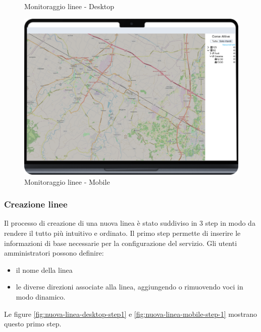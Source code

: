 \begin{figure}[H]
\begin{minipage}[b]{0.25\textwidth}
    \caption{Monitoraggio linee - Desktop}
    \label{fig:monitoraggio_linee_desktop}
  \end{minipage}
  \hfill
  \begin{minipage}[b]{0.68\textwidth}
    \centering
    \includegraphics[width=\textwidth]{images/mockup/Mappa.png}
    \caption{Monitoraggio linee - Mobile}
    \label{fig:monitoraggio_linee_mobile}
  \end{minipage}
\end{figure}

\subsubsection{Creazione linee}

Il processo di creazione di una nuova linea è stato suddiviso in 3 step in modo da rendere il tutto più intuitivo e ordinato.
Il primo step permette di inserire le informazioni di base necessarie per la configurazione del servizio. Gli utenti amministratori possono definire:
\begin{itemize}
    \item il nome della linea
    \item le diverse direzioni associate alla linea, aggiungendo o rimuovendo voci in modo dinamico.
\end{itemize}
Le figure \ref{fig:nuova-linea-desktop-step1} e \ref{fig:nuova-linea-mobile-step-1} mostrano questo primo step.

